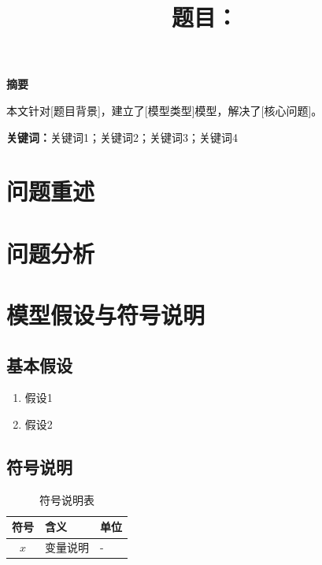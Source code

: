 \documentclass[12pt,a4paper]{ctexart}
\title{\textbf{题目：\hspace{2em}\makebox[8cm]{\dotfill}}}
\author{}
\date{}
\begin{document}
\maketitle
\thispagestyle{empty}

\begin{center}
\textbf{\Large 摘\quad 要}
\end{center}

本文针对[题目背景]，建立了[模型类型]模型，解决了[核心问题]。

\textbf{关键词：}关键词1；关键词2；关键词3；关键词4

\newpage
\tableofcontents
\newpage

\section{问题重述}


\section{问题分析}


\section{模型假设与符号说明}

\subsection{基本假设}
\begin{enumerate}[label=(\arabic*)]
    \item 假设1
    \item 假设2
\end{enumerate}

\subsection{符号说明}
\begin{table}[H]
\centering
\caption{符号说明表}
\begin{tabular}{cll}
\toprule
\textbf{符号} & \textbf{含义} & \textbf{单位} \\
\midrule
$x$ & 变量说明 & - \\
\bottomrule
\end{tabular}
\end{table}
\end{document}
